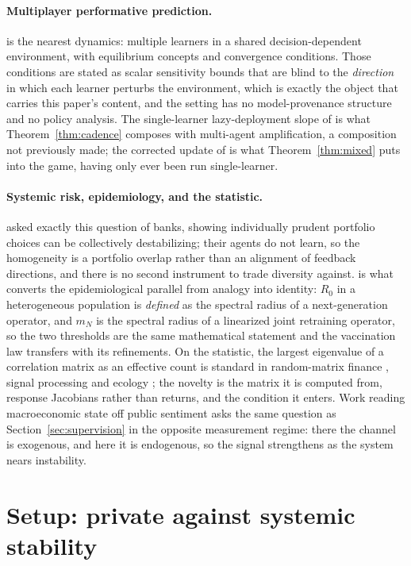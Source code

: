 \documentclass{article}
\theoremstyle{plain}
\theoremstyle{definition}
\newcommand{\mN}{m_N}
\begin{document}
\paragraph{Multiplayer performative prediction.}
\citet{narang2023} is the nearest dynamics: multiple learners in a shared decision-dependent environment, with equilibrium concepts and convergence conditions. Those conditions are stated as scalar sensitivity bounds that are blind to the \emph{direction} in which each learner perturbs the environment, which is exactly the object that carries this paper's content, and the setting has no model-provenance structure and no policy analysis. The single-learner lazy-deployment slope of \citet{mendlerdunner2020} is what Theorem~\ref{thm:cadence} composes with multi-agent amplification, a composition not previously made; the corrected update of \citet{izzo2021} is what Theorem~\ref{thm:mixed} puts into the game, having only ever been run single-learner.

\paragraph{Systemic risk, epidemiology, and the statistic.}
\citet{beale2011} asked exactly this question of banks, showing individually prudent portfolio choices can be collectively destabilizing; their agents do not learn, so the homogeneity is a portfolio overlap rather than an alignment of feedback directions, and there is no second instrument to trade diversity against. \citet{diekmann1990} is what converts the epidemiological parallel from analogy into identity: $R_0$ in a heterogeneous population is \emph{defined} as the spectral radius of a next-generation operator, and $\mN$ is the spectral radius of a linearized joint retraining operator, so the two thresholds are the same mathematical statement and the vaccination law transfers with its refinements. On the statistic, the largest eigenvalue of a correlation matrix as an effective count is standard in random-matrix finance \citep{laloux1999,plerou2002}, signal processing \citep{roy2007} and ecology \citep{hill1973}; the novelty is the matrix it is computed from, response Jacobians rather than returns, and the condition it enters. Work reading macroeconomic state off public sentiment \citep{pebsa2024} asks the same question as Section~\ref{sec:supervision} in the opposite measurement regime: there the channel is exogenous, and here it is endogenous, so the signal strengthens as the system nears instability.

\section{Setup: private against systemic stability}
\label{sec:setup}
\end{document}
